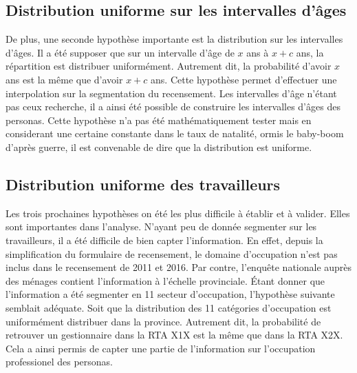 \documentclass[11pt,french]{report}\usepackage[]{graphicx}\usepackage[]{color}
\begin{document}
\subsection*{Distribution uniforme sur les intervalles d'âges}
De plus, une seconde hypothèse importante est la distribution sur les intervalles d'âges. Il a été supposer que sur un intervalle d'âge de $x$ ans à $x + c$ ans, la répartition est distribuer uniformément. Autrement dit, la probabilité d'avoir $x$ ans est la même que d'avoir $x + c$ ans. Cette hypothèse permet d'effectuer une interpolation sur la segmentation du recensement. Les intervalles d'âge n'étant pas ceux recherche, il a ainsi été possible de construire les intervalles d'âges des personas. Cette hypothèse n'a pas été mathématiquement tester mais en considerant une certaine constante dans le taux de natalité, ormis le baby-boom d'après guerre, il est convenable de dire que la distribution est uniforme.

\subsection*{Distribution uniforme des travailleurs}
Les trois prochaines hypothèses on été les plus difficile à établir et à valider. Elles sont importantes dans l'analyse. N'ayant peu de donnée segmenter sur les travailleurs, il a été difficile de bien capter l'information. En effet, depuis la simplification du formulaire de recensement, le domaine d'occupation n'est pas inclus dans le recensement de 2011 et 2016. Par contre, l'enquête nationale auprès des ménages contient l'information à l'échelle provinciale. Étant donner que l'information a été segmenter en 11 secteur d'occupation, l'hypothèse suivante semblait adéquate. Soit que la distribution des 11 catégories d'occupation est uniformément distribuer dans la province. Autrement dit, la probabilité de retrouver un gestionnaire dans la RTA X1X est la même que dans la RTA X2X. Cela a ainsi permis de capter une partie de l'information sur l'occupation professionel des personas. 
\end{document}
